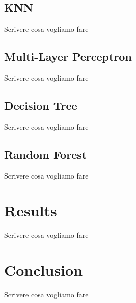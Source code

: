 \documentclass{article}
\begin{document}
\subsection{KNN}
Scrivere cosa vogliamo fare

\subsection{Multi-Layer Perceptron}
Scrivere cosa vogliamo fare

\subsection{Decision Tree}
Scrivere cosa vogliamo fare

\subsection{Random Forest}
Scrivere cosa vogliamo fare

\section{Results}
Scrivere cosa vogliamo fare

\section{Conclusion}
Scrivere cosa vogliamo fare
\end{document}
